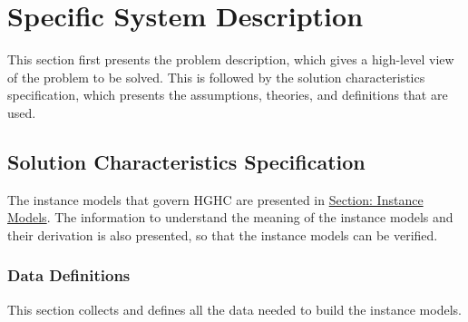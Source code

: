 \documentclass[12pt]{article}
\begin{document}
\section{Specific System Description}
\label{Sec:SpecSystDesc}
This section first presents the problem description, which gives a high-level view of the problem to be solved. This is followed by the solution characteristics specification, which presents the assumptions, theories, and definitions that are used.

\subsection{Solution Characteristics Specification}
\label{Sec:SolCharSpec}
The instance models that govern HGHC are presented in \hyperref[Sec:IMs]{Section: Instance Models}. The information to understand the meaning of the instance models and their derivation is also presented, so that the instance models can be verified.

\subsubsection{Data Definitions}
\label{Sec:DDs}
This section collects and defines all the data needed to build the instance models.
\end{document}
